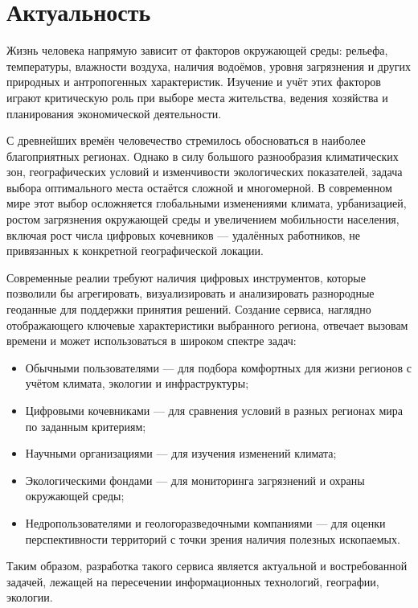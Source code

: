 \section{Актуальность}
Жизнь человека напрямую зависит от факторов окружающей среды: рельефа, температуры, влажности воздуха, наличия водоёмов, уровня загрязнения и других природных и антропогенных характеристик. 
Изучение и учёт этих факторов играют критическую роль при выборе места жительства, ведения хозяйства и планирования экономической деятельности.

С древнейших времён человечество стремилось обосноваться в наиболее благоприятных регионах.
Однако в силу большого разнообразия климатических зон, географических условий и изменчивости экологических показателей, задача выбора оптимального места остаётся сложной и многомерной. 
В современном мире этот выбор осложняется глобальными изменениями климата, урбанизацией, ростом загрязнения окружающей среды и увеличением мобильности населения, включая рост числа цифровых кочевников — удалённых работников, не привязанных к конкретной географической локации.

Современные реалии требуют наличия цифровых инструментов, которые позволили бы агрегировать, визуализировать и анализировать разнородные геоданные для поддержки принятия решений. 
Создание сервиса, наглядно отображающего ключевые характеристики выбранного региона, отвечает вызовам времени и может использоваться в широком спектре задач:
\begin{itemize}
	\item Обычными пользователями — для подбора комфортных для жизни регионов с учётом климата, экологии и инфраструктуры;
	\item Цифровыми кочевниками — для сравнения условий в разных регионах мира по заданным критериям;
	\item Научными организациями — для изучения изменений климата;
	\item Экологическими фондами — для мониторинга загрязнений и охраны окружающей среды;
	\item Недропользователями и геологоразведочными компаниями — для оценки перспективности территорий с точки зрения наличия полезных ископаемых.
\end{itemize}

Таким образом, разработка такого сервиса является актуальной и востребованной задачей, лежащей на пересечении информационных технологий, географии, экологии.